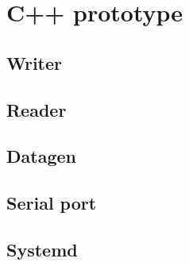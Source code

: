 \chapter{C++ prototype}\label{appendix:cpp_prototype}

\section{Writer}
\begin{minipage}{\linewidth}

\end{minipage}
\section{Reader}

\section{Datagen}

\section{Serial port}\label{secA:serial_port}

\section{Systemd}\label{secA:systemd}

